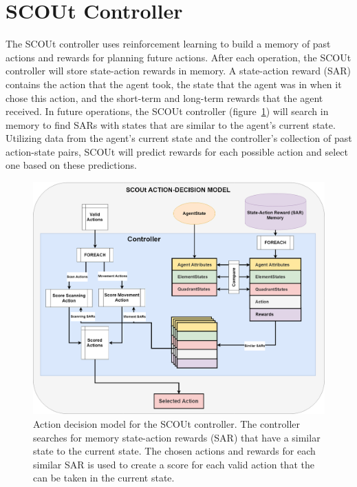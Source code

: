 \section{SCOUt Controller} \label{sec:scout_controller}
The SCOUt controller uses reinforcement learning to build a memory of past actions and rewards for planning future actions.
After each operation, the SCOUt controller will store state-action rewards in memory.
A state-action reward (SAR) contains the action that the agent took, the state that the agent was in when it chose this action, and the short-term and long-term rewards that the agent received.
In future operations, the SCOUt controller (figure~\ref{fig:scout_decision_model}) will search in memory to find SARs with states that are similar to the agent's current state.
Utilizing data from the agent's current state and the controller's collection of past action-state pairs, SCOUt will predict rewards for each possible action and select one based on these predictions.

\begin{figure}[H]
  \centering
  \includegraphics[width=1.0\columnwidth]{Figures/scout_decision_model.png}
  \caption[SCOUt Control Model]{Action decision model for the SCOUt controller. The controller searches for memory state-action rewards (SAR) that have a similar state to the current state. The chosen actions and rewards for each similar SAR is used to create a score for each valid action that the can be taken in the current state.}
  \label{fig:scout_decision_model}
\end{figure}

